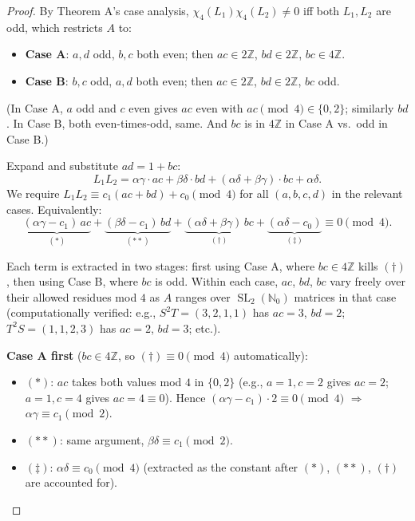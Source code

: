 \documentclass[11pt]{article}
\DeclareMathOperator{\SL}{SL}
\begin{document}
\begin{proof}
By Theorem A's case analysis, $\chi_4(L_1)\chi_4(L_2) \ne 0$ iff both $L_1, L_2$
are odd, which restricts $A$ to:
\begin{itemize}
\item \textbf{Case A}: $a, d$ odd, $b, c$ both even; then $ac \in 2\mathbb{Z}$,
$bd \in 2\mathbb{Z}$, $bc \in 4\mathbb{Z}$.
\item \textbf{Case B}: $b, c$ odd, $a, d$ both even; then $ac \in 2\mathbb{Z}$,
$bd \in 2\mathbb{Z}$, $bc$ odd.
\end{itemize}
(In Case A, $a$ odd and $c$ even gives $ac$ even with $ac \pmod 4 \in \{0, 2\}$;
similarly $bd$. In Case B, both even-times-odd, same. And $bc$ is in
$4\mathbb{Z}$ in Case A vs.\ odd in Case B.)

Expand and substitute $ad = 1 + bc$:
\[
L_1 L_2 = \alpha\gamma \cdot ac + \beta\delta \cdot bd
+ (\alpha\delta + \beta\gamma) \cdot bc + \alpha\delta.
\]
We require $L_1 L_2 \equiv c_1(ac + bd) + c_0 \pmod 4$ for all $(a,b,c,d)$ in
the relevant cases. Equivalently:
\[
\underbrace{(\alpha\gamma - c_1)\,ac}_{(*)} +
\underbrace{(\beta\delta - c_1)\,bd}_{(**)} +
\underbrace{(\alpha\delta + \beta\gamma)\,bc}_{(\dagger)} +
\underbrace{(\alpha\delta - c_0)}_{(\ddagger)} \equiv 0 \pmod 4.
\]

Each term is extracted in two stages: first using Case A, where $bc \in 4\mathbb{Z}$
kills $(\dagger)$, then using Case B, where $bc$ is odd. Within each case, $ac$,
$bd$, $bc$ vary freely over their allowed residues mod $4$ as $A$ ranges over
$\SL_2(\mathbb{N}_0)$ matrices in that case (computationally verified: e.g.,
$S^2 T = (3,2,1,1)$ has $ac=3$, $bd=2$; $T^2 S = (1,1,2,3)$ has $ac=2$, $bd=3$;
etc.).

\smallskip
\textbf{Case A first} ($bc \in 4\mathbb{Z}$, so $(\dagger) \equiv 0 \pmod 4$
automatically):
\begin{itemize}
\item $(*)$: $ac$ takes both values mod $4$ in $\{0, 2\}$ (e.g., $a=1, c=2$
gives $ac=2$; $a=1, c=4$ gives $ac=4 \equiv 0$). Hence
$(\alpha\gamma - c_1) \cdot 2 \equiv 0 \pmod 4$ $\Rightarrow$
$\alpha\gamma \equiv c_1 \pmod 2$.
\item $(**)$: same argument, $\beta\delta \equiv c_1 \pmod 2$.
\item $(\ddagger)$: $\alpha\delta \equiv c_0 \pmod 4$ (extracted as the constant
after $(*)$, $(**)$, $(\dagger)$ are accounted for).
\end{itemize}


\end{proof}
\end{document}
